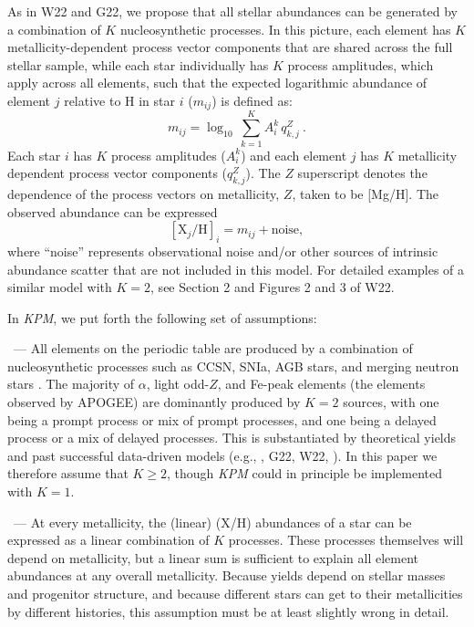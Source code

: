 \documentclass[modern, linenumbers]{aastex631}
\newcommand{\name}{\textsl{KPM}}
\renewcommand{\paragraph}[1]{\bigskip\par\noindent{\textbf{#1}}~---}
\begin{document}
As in W22 and G22, we propose that all stellar abundances can be generated by a combination of $K$ nucleosynthetic processes.
In this picture, each element has $K$ metallicity-dependent process vector components that are shared across the full stellar sample, while each star individually has $K$ process amplitudes, which apply across all elements, such that the expected logarithmic abundance of element $j$ relative to H in star $i$ ($m_{ij}$) is defined as:
\begin{equation}\label{eq:mij_k}
    m_{ij} = \log_{10} \, \sum^K_{k=1} A_i^k \, q_{k,j}^Z ~.
\end{equation}
Each star $i$ has $K$ process amplitudes ($A^k_i$)
and each element $j$ has $K$ metallicity dependent process vector components ($q_{k,j}^{Z}$). 
The $Z$ superscript denotes the dependence of the process vectors on metallicity, $Z$, taken to be [Mg/H].
The observed abundance can be expressed
\begin{equation}\label{eq:xh}
    [\text{X}_j/\text{H}]_i = m_{ij} + \text{noise},
\end{equation}
where ``noise'' represents observational noise and/or other sources of intrinsic abundance scatter that are not included in this model. For detailed examples of a similar model with $K=2$, see Section 2 and Figures 2 and 3 of W22.

In \name{}, we put forth the following set of assumptions: 

\paragraph{1. $K$ processes}
All elements on the periodic table are produced by a combination of nucleosynthetic processes such as CCSN, SNIa, AGB stars, and merging neutron stars \citep{johnsonja2020}. The majority of $\alpha$, light odd-$Z$, and Fe-peak elements (the elements observed by APOGEE) are dominantly produced by $K=2$ sources, with one being a prompt process or mix of prompt processes, and one being a delayed process or a mix of delayed processes. This is substantiated by theoretical yields \citep[e.g.,][]{anderson2019, rybizki2017} and past successful data-driven models (e.g., \citealp{ness2019}, G22, W22, \citealp{ting2022, ratcliffe2023}). In this paper we therefore assume that $K \geq 2$, though \name{} could in principle be implemented with $K=1$.

\paragraph{2. Linearity}
At every metallicity, the (linear) (X/H) abundances of a star can be expressed as a linear combination of $K$ processes.
These processes themselves will depend on metallicity, but a linear sum is sufficient to explain all element abundances at any overall metallicity.
Because yields depend on stellar masses and progenitor structure, and because different stars can get to their metallicities by different histories, this assumption must be at least slightly wrong in detail.
\end{document}
